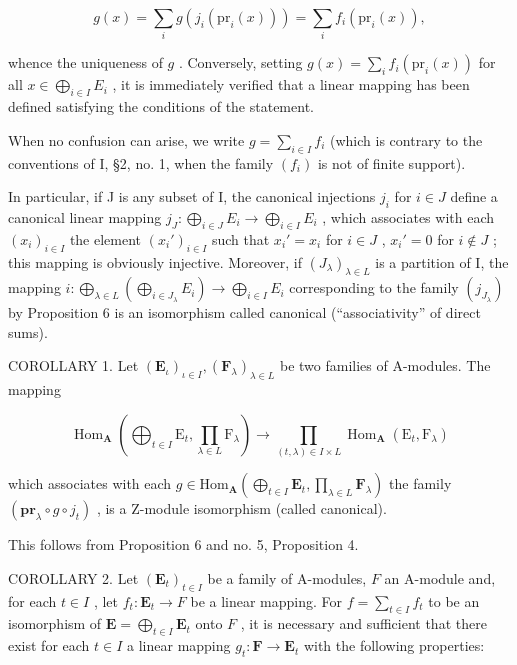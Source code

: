\[
g (x) = \sum_ {i} g (j _ {i} (\mathrm{pr} _ {i} (x))) = \sum_ {i} f _ {i} (\mathrm{pr} _ {i} (x)),
\]

whence the uniqueness of \(g\) . Conversely, setting \(g(x) = \sum_{i} f_i(\mathrm{pr}_i(x))\) for all \(x \in \bigoplus_{i \in I} E_i\) , it is immediately verified that a linear mapping has been defined satisfying the conditions of the statement.

When no confusion can arise, we write \(g = \sum_{i \in I} f_i\) (which is contrary to the conventions of I, §2, no. 1, when the family \((f_i)\) is not of finite support).

In particular, if J is any subset of I, the canonical injections \(j_{i}\) for \(i \in J\) define a canonical linear mapping \(j_{J}: \bigoplus_{i \in J} E_{i} \to \bigoplus_{i \in I} E_{i}\) , which associates with each \((x_{i})_{i \in I}\) the element \((x_{i}')_{i \in I}\) such that \(x_{i}' = x_{i}\) for \(i \in J\) , \(x_{i}' = 0\) for \(i \notin J\) ; this mapping is obviously injective. Moreover, if \((J_{\lambda})_{\lambda \in L}\) is a partition of I, the mapping \(i: \bigoplus_{\lambda \in L} \left( \bigoplus_{i \in J_{\lambda}} E_{i} \right) \to \bigoplus_{i \in I} E_{i}\) corresponding to the family \((j_{J_{\lambda}})\) by Proposition 6 is an isomorphism called canonical (``associativity'' of direct sums).

COROLLARY 1. Let \((\mathbf{E}_{\iota})_{\iota \in I}, (\mathbf{F}_{\lambda})_{\lambda \in L}\) be two families of A-modules. The mapping

\[
\operatorname{Hom} _ {\mathbf {A}} \left(\bigoplus_ {t \in I} \mathrm{E} _ {t}, \prod_ {\lambda \in L} \mathrm{F} _ {\lambda}\right)\rightarrow \prod_ {(t, \lambda) \in I \times L} \operatorname{Hom} _ {\mathbf {A}} \left(\mathrm{E} _ {t}, \mathrm{F} _ {\lambda}\right)\tag{22}
\]

which associates with each \(g \in \mathrm{Hom}_{\mathbf{A}} \left( \bigoplus_{t \in I} \mathbf{E}_t, \prod_{\lambda \in L} \mathbf{F}_\lambda \right)\) the family \((\mathbf{pr}_\lambda \circ g \circ j_t)\) , is a Z-module isomorphism (called canonical).

This follows from Proposition 6 and no. 5, Proposition 4.

COROLLARY 2. Let \((\mathbf{E}_t)_{t \in I}\) be a family of A-modules, \(F\) an A-module and, for each \(t \in I\) , let \(f_t: \mathbf{E}_t \to F\) be a linear mapping. For \(f = \sum_{t \in I} f_t\) to be an isomorphism of \(\mathbf{E} = \bigoplus_{t \in I} \mathbf{E}_t\) onto \(F\) , it is necessary and sufficient that there exist for each \(t \in I\) a linear mapping \(g_t: \mathbf{F} \to \mathbf{E}_t\) with the following properties:

